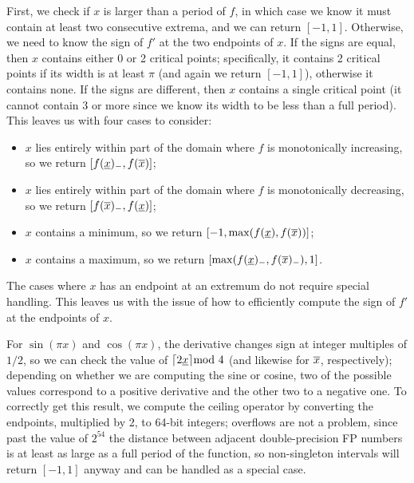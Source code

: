 First, we check if $x$ is larger than a period of $f$, in which case we know it must contain at least two consecutive extrema, and we can return $[-1,1]$.
Otherwise, we need to know the sign of $f'$ at the two endpoints of $x$.
If the signs are equal, then $x$ contains either 0 or 2 critical points; specifically, it contains 2 critical points if its width is at least $\pi$ (and again we return $[-1,1]$), otherwise it contains none.
If the signs are different, then $x$ contains a single critical point (it cannot contain 3 or more since we know its width to be less than a full period).
This leaves us with four cases to consider:
\begin{itemize}
	\item $x$ lies entirely within part of the domain where $f$ is monotonically increasing, so we return $[f(\underline{x})_-, f(\overline{x})]$;
	\item $x$ lies entirely within part of the domain where $f$ is monotonically decreasing, so we return $[f(\overline{x})_-, f(\underline{x})]$;
	\item $x$ contains a minimum, so we return $[-1, \max(f(\underline{x}), f(\overline{x}))]$;
	\item $x$ contains a maximum, so we return $[\max(f(\underline{x})_-, f(\overline{x})_-), 1]$.
\end{itemize}
The cases where $x$ has an endpoint at an extremum do not require special handling.
This leaves us with the issue of how to efficiently compute the sign of $f'$ at the endpoints of $x$.

For $\sin(\pi x)$ and $\cos(\pi x)$, the derivative changes sign at integer multiples of $1/2$, so we can check the value of $\lceil2\underline{x}\rceil\mathrm{mod}\ 4$ (and likewise for $\overline{x}$, respectively); depending on whether we are computing the sine or cosine, two of the possible values correspond to a positive derivative and the other two to a negative one.
To correctly get this result, we compute the ceiling operator by converting the endpoints, multiplied by 2, to 64-bit integers; overflows are not a problem, since past the value of $2^{54}$ the distance between adjacent double-precision FP numbers is at least as large as a full period of the function, so non-singleton intervals will return $[-1,1]$ anyway and can be handled as a special case.

